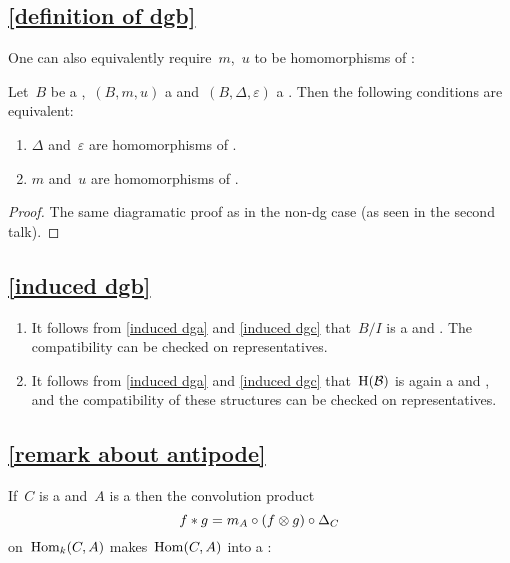\subsection{\cref{definition of dgb}}
\label{definition of dgb remark}

One can also equivalently require~$m$,~$u$ to be homomorphisms of {\dgcs}:

\begin{lemma}
  \label{characterization of bialgebras}
  Let~$B$ be a {\dgv},~$(B, m, u)$ a {\dga} and~$(B, \Delta, \varepsilon)$ a {\dgc}.
  Then the following conditions are equivalent:
  \begin{enumerate}
    \item
      $\Delta$ and~$\varepsilon$ are homomorphisms of {\dgas}.
    \item
      $m$ and~$u$ are homomorphisms of {\dgcs}.
  \end{enumerate}
\end{lemma}

\begin{proof}
  The same diagramatic proof as in the non-dg case (as seen in the second talk).
\end{proof}





\subsection{\cref{induced dgb}}
\label{induced dgb proof}

\begin{enumerate}
  \item
    It follows from \cref{induced dga} and \cref{induced dgc} that~$B/I$ is a {\dga} and {\dgc}.
    The compatibility can be checked on representatives.
  \item
    It follows from \cref{induced dga} and \cref{induced dgc} that~$\operatorname{H}(\mathcal{B})$ is again a {\dga} and {\dgc}, and the compatibility of these structures can be checked on representatives.
\end{enumerate}





\subsection{\cref{remark about antipode}}
\label{remark about antipode proof}

If~$C$ is a {\dgc} and~$A$ is a {\dga} then the convolution product
\[
  f * g
  =
  m_A \circ (f \otimes g) \circ \Delta_C
\]
on~$\operatorname{Hom}_k(C,A)$ makes~$\operatorname{Hom}(C,A)$ into a {\dga}:

